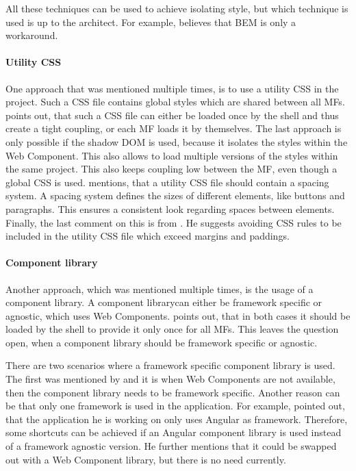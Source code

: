 All these techniques can be used to achieve isolating style, but which technique is used is up to the architect.
For example, \textcite{Dornenburg.2019} believes that \ac{BEM} is only a workaround.



\paragraph{Utility \ac{CSS}}

One approach that was mentioned multiple times, is to use a utility \ac{CSS} in the project.
Such a \ac{CSS} file contains global styles which are shared between all \acp{MF}.
\textciteOlleck{} points out, that such a \ac{CSS} file can either be loaded once by the shell and thus create a tight coupling, or each \ac{MF} loads it by themselves.
The last approach is only possible if the shadow \ac{DOM} is used, because it isolates the styles within the Web Component.
This also allows to load multiple versions of the styles within the same project.
This also keeps coupling low between the \acs{MF}, even though a global \ac{CSS} is used.
\textciteRehm{} mentions, that a utility \ac{CSS} file should contain a spacing system.
A spacing system defines the sizes of different elements, like buttons and paragraphs.
This ensures a consistent look regarding spaces between elements.
Finally, the last comment on this is from \textcite{Laug.2018}.
He suggests avoiding \ac{CSS} rules to be included in the utility \ac{CSS} file which exceed margins and paddings.



\paragraph{Component library}

Another approach, which was mentioned multiple times, is the usage of a component library.
A component library\footnotemark can either be framework specific or agnostic, which uses Web Components.
\textciteRehm{} points out, that in both cases it should be loaded by the shell to provide it only once for all \acp{MF}.
This leaves the question open, when a component library should be framework specific or agnostic.

There are two scenarios where a framework specific component library is used.
The first was mentioned by \textciteJovanovic{} and it is when Web Components are not available, then the component library needs to be framework specific.
Another reason can be that only one framework is used in the application.
For example, \textciteRehm{} pointed out, that the application he is working on only uses Angular as framework.
Therefore, some shortcuts can be achieved if an Angular component library is used instead of a framework agnostic version.
He further mentions that it could be swapped out with a Web Component library, but there is no need currently.

